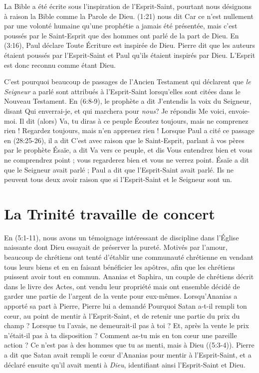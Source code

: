 La Bible a été écrite sous l'inspiration de l'Esprit-Saint, pourtant nous
 désignons à raison la Bible comme la Parole de Dieu.
 (1:21) nous dit\frcolon{}
 \Og Car ce n'est nullement par une volonté humaine qu'une prophétie a jamais
 été présentée, mais c'est poussés par le Saint-Esprit que des hommes ont parlé
 de la part de Dieu. \Fg{}
 En (3:16), Paul déclare\frcolon{}
 \Og Toute Écriture est inspirée de Dieu. \Fg{}
 Pierre dit que les auteurs étaient poussés par l'Esprit-Saint et Paul qu'ils
 étaient inspirés par Dieu. L'Esprit est donc reconnu comme étant Dieu.

C'est pourquoi beaucoup de passages de l'Ancien Testament qui déclarent que
 \emph{le Seigneur} a parlé sont attribués à l'Esprit-Saint lors\-qu'elles
 sont citées dans le Nouveau Testament.
 En (6:8-9), le prophète a dit\frcolon{} \Og J'entendis la voix du
 Seigneur, disant\frcolon{} Qui enverrai-je, et qui marchera pour \emph{nous}? Je répondis\frcolon{}
 Me voici, envoie-moi. Il dit (alors)\frcolon{} Va, tu diras à ce peuple\frcolon{}
 Écoutez toujours, mais ne comprenez rien ! Regardez toujours, mais n'en
 apprenez rien ! \Fg{}
 Lorsque Paul a cité ce passage en (28:25-26), il a dit\frcolon{}
 \Og C'est avec raison que le Saint-Esprit, parlant à vos pères par le
 prophète Ésaïe, a dit\frcolon{} Va vers ce peuple, et dis\frcolon{} Vous entendrez bien et
 vous ne comprendrez point ; vous regarderez bien et vous ne verrez point. \Fg{}
 Ésaïe a dit que le Seigneur avait parlé ; Paul a dit que l'Esprit-Saint
 avait parlé.
 Ils ne peuvent tous deux avoir raison que si l'Esprit-Saint et le Seigneur sont un.


\section{La Trinit\'e travaille de concert}

En (5:1-11), nous avons un témoignage intéressant de
 discipline dans l'Église naissante dont Dieu essayait de préserver
 la pureté.
 Motivés par l'amour, beaucoup de chrétiens ont tenté d'établir une
 communauté chrétienne en vendant tous leurs biens et en en faisant
 bénéficier les apôtres, afin que les chrétiens puissent avoir tout en
 commun. Ananias et Saphira, un couple de chrétiens décrit dans le livre des Actes, ont vendu leur
 propriété mais ont ensemble décidé de garder une partie de l'argent de la vente pour
 eux-mêmes. Lorsqu'Ananias a apporté sa part à Pierre, Pierre lui a
 demandé\frcolon{} \Og Pourquoi Satan a-t-il rempli ton cœur, au point de mentir
 à l'Esprit-Saint, et de retenir une partie du prix du champ ? Lorsque tu
 l'avais, ne demeurait-il pas à toi ? Et, après la vente le prix n'était-il
 pas à ta disposition ?
 Comment as-tu mis en ton cœur une pareille action ?
 Ce n'est pas à des hommes que tu as menti, mais à Dieu \Fg{}
 ((5:3-4)).  
 Pierre a dit que Satan avait rempli le cœur d'Ananias pour mentir
 à l'Esprit-Saint, et a déclaré ensuite qu'il avait menti à \emph{Dieu}, identifiant
 ainsi l'Esprit-Saint et Dieu.

